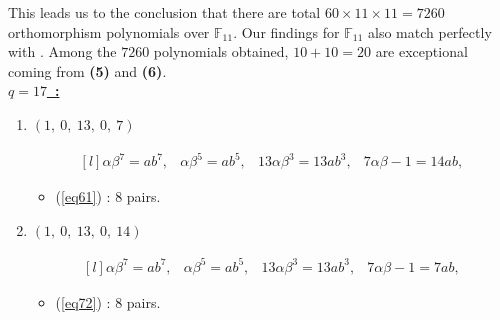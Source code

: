 \documentclass[12pt,a4wide, reqno]{amsart}
\theoremstyle{definition}
\theoremstyle{remark}
\numberwithin{equation}{section}
\begin{document}
    This leads us to the conclusion that there are total $60\times 11 \times 11 =7260$ orthomorphism polynomials over $\mathbb{F}_{11}.$ Our findings for $\mathbb{F}_{11}$ also match perfectly with \cite[Table~3.2]{shallue}. Among the $7260$ polynomials obtained, $10+10=20$ are exceptional coming from \textbf{(5)} and \textbf{(6)}.
    \vspace{0.5 cm}\\
\underline{\Large \textbf{$q=17$~:}}
\vspace{0.2cm}
\begin{enumerate}[label=\textbf{(\arabic*)}]
\item 
$(1,~0,~13,~0,~7)$ 

\begin{equation}\label{eq61}
    \begin{matrix*}[l]
          \alpha \beta ^7=ab^7, & \alpha \beta ^5=ab^5, & 13\alpha \beta ^3=13ab^3, & 7\alpha\beta-1=14ab,
    \end{matrix*}
\end{equation}
\begin{itemize}
    \item 
    (\ref{eq61}) : $8$ pairs.
    \end{itemize}

    \item 
    $(1,~0,~13,~0,~14)$ 

\begin{equation}\label{eq72}
    \begin{matrix*}[l]
          \alpha \beta ^7=ab^7, & \alpha \beta ^5=ab^5, & 13\alpha \beta ^3=13ab ^3, & 7\alpha\beta-1=7ab,
    \end{matrix*}
\end{equation}
\begin{itemize}
    
    \item 
    (\ref{eq72}) : $8$ pairs.
    \end{itemize}
    \end{enumerate}
    
\end{document}
